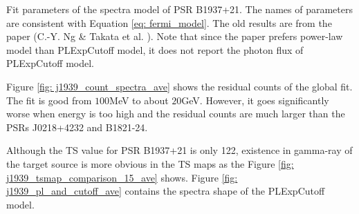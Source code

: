 \documentclass[12pt]{report}
\newcommand{\mycaption}[1]{\protect \caption{#1}}
\begin{document}
        \begin{table}[!ht]
          \centering
            \mycaption{Fit parameters of the spectra model of PSR B1937+21. 
              The names of parameters are consistent with Equation
              \ref{eq: fermi_model}. The old results are from the paper (C.-Y. Ng \& Takata et al. 
              \cite{0004-637X-787-2-167}). Note that since the paper prefers power-law model 
              than PLExpCutoff model, it does not report the photon flux of PLExpCutoff model.}
            \label{table: j1939_fit_result_ave}        
        \end{table} 

        Figure \ref{fig: j1939_count_spectra_ave} shows the residual counts of the global fit.
        The fit is good from $100$MeV to about $20$GeV. However, it goes significantly worse when 
        energy is too high and the residual counts are much larger than the PSRs J0218+4232 and 
        B1821-24.

        Although the TS value for PSR B1937+21 is only 122, existence in gamma-ray of the 
        target source is more obvious in the TS maps as the Figure 
        \ref{fig: j1939_tsmap_comparison_15_ave} shows. Figure 
        \ref{fig: j1939_pl_and_cutoff_ave} contains the spectra shape of the PLExpCutoff model. 
\end{document}
